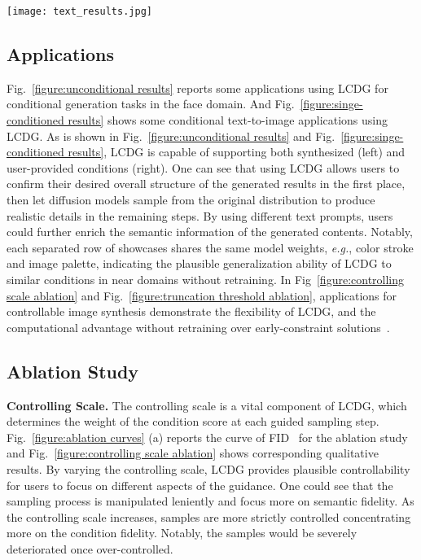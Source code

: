 \documentclass{article}
\begin{document}
  \begin{figure*}[t!]
  \centering
  \texttt{[image: text\_results.jpg]} \vspace{-1em}
  \caption{Conditional text-to-image synthesis results of LCDG, implemented with text-to-image SD~\cite{rombach2022high}. Note that each row of the cases share the same model during inference.}
  \label{figure:singe-conditioned results}
  \vspace{-1em}
  \end{figure*}

\subsection{Applications}

Fig.~\ref{figure:unconditional results} reports some applications using LCDG for conditional generation tasks in the face domain. And Fig.~\ref{figure:singe-conditioned results} shows some conditional text-to-image applications using LCDG. As is shown in Fig.~\ref{figure:unconditional results} and Fig.~\ref{figure:singe-conditioned results}, LCDG is capable of supporting both synthesized (left) and user-provided conditions (right). One can see that using LCDG allows users to confirm their desired overall structure of the generated results in the first place, then let diffusion models sample from the original distribution to produce realistic details in the remaining steps. By using different text prompts, users could further enrich the semantic information of the generated contents. Notably, each separated row of showcases shares the same model weights, \textit{e.g.}, color stroke and image palette, indicating the plausible generalization ability of LCDG to similar conditions in near domains without retraining. In Fig~\ref{figure:controlling scale ablation} and Fig.~\ref{figure:truncation threshold ablation}, applications for controllable image synthesis demonstrate the flexibility of LCDG, and the computational advantage without retraining over early-constraint solutions~\cite{zhang2023adding,mou2023t2i,wang2018high}.


\subsection{Ablation Study}
\label{subsection:ablation study}



\textbf{Controlling Scale.} The controlling scale is a vital component of LCDG, which determines the weight of the condition score at each guided sampling step. Fig.~\ref{figure:ablation curves} (a) reports the curve of FID~\cite{NIPS2017_8a1d6947} for the ablation study and Fig.~\ref{figure:controlling scale ablation} shows corresponding qualitative results. By varying the controlling scale, LCDG provides plausible controllability for users to focus on different aspects of the guidance. One could see that the sampling process is manipulated leniently and focus more on semantic fidelity. As the controlling scale increases, samples are more strictly controlled concentrating more on the condition fidelity. Notably, the samples would be severely deteriorated once over-controlled.
\end{document}
